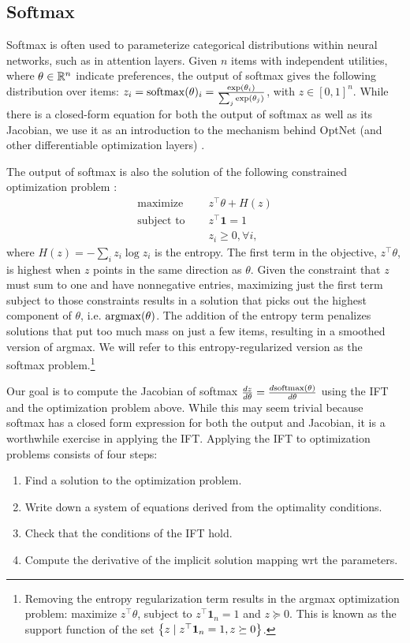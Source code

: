 \documentclass[11pt]{article}
\begin{document}
\subsection{Softmax}
Softmax is often used to parameterize categorical distributions within neural networks,
such as in attention layers.
Given $n$ items with independent utilities, where $\theta \in \mathbb{R}^n$
indicate preferences,
the output of softmax gives the following distribution over items:
$z_i = \mathrm{softmax}(\theta)_i = \frac{\exp(\theta_i)}{\sum_j \exp(\theta_j)}$, with $z\in[0,1]^n$.
While there is a closed-form equation
for both the output of softmax as well as its Jacobian,
we use it as an introduction to the mechanism
behind OptNet (and other differentiable optimization layers)
\citep{optnet,agrawal2019diffcvx}.

The output of softmax is also the solution of the following constrained optimization problem
\citep{gao2018properties}:
\begin{equation}
\label{eqn:softmax-opt}
\begin{aligned}
\textrm{maximize } \quad & z^\top\theta + H(z)\\
\textrm{subject to } \quad & z^\top \mathbf{1} = 1\\
& z_i \geq 0, \forall i,
\end{aligned}
\end{equation}
where $H(z) = -\sum_i z_i \log z_i$ is the entropy.
The first term in the objective, $z^\top\theta$, is highest when $z$ points in the
same direction as $\theta$.
Given the constraint that $z$ must sum to one and have nonnegative entries,
maximizing just the first term subject to those constraints results in a solution
that picks out the highest component of $\theta$, i.e. $\operatorname*{argmax}(\theta)$.
The addition of the entropy term penalizes solutions that put too much
mass on just a few items, resulting in a smoothed version of argmax.
We will refer to this entropy-regularized version as the softmax problem.\footnote{
Removing the entropy regularization term results in the argmax optimization problem:
maximize $z^\top\theta$, subject to $z^\top\mathbf{1}_n=1$
and $z \succeq 0$.
This is known as the support function of the set $\left\{z\mid z^\top\mathbf{1}_n=1,z\succeq 0\right\}$.
}

Our goal is to compute the Jacobian of softmax
$\frac{dz}{d\theta} = \frac{d\mathrm{softmax}(\theta)}{d\theta}$
using the IFT and the optimization problem above.
While this may seem trivial because softmax has a closed form expression for
both the output and Jacobian, it is a worthwhile exercise in applying the IFT.
Applying the IFT to optimization problems consists of four steps:
\begin{enumerate}
\item Find a solution to the optimization problem.
\item Write down a system of equations derived from the optimality conditions.
\item Check that the conditions of the IFT hold.
\item Compute the derivative of the implicit solution mapping wrt the parameters.
\end{enumerate}
\end{document}
